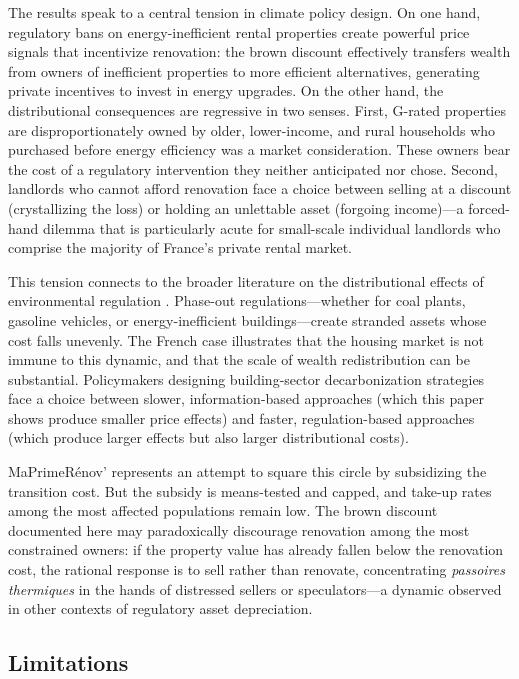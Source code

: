 \documentclass[12pt]{article}
\begin{document}
The results speak to a central tension in climate policy design. On one hand, regulatory bans on energy-inefficient rental properties create powerful price signals that incentivize renovation: the brown discount effectively transfers wealth from owners of inefficient properties to more efficient alternatives, generating private incentives to invest in energy upgrades. On the other hand, the distributional consequences are regressive in two senses. First, G-rated properties are disproportionately owned by older, lower-income, and rural households who purchased before energy efficiency was a market consideration. These owners bear the cost of a regulatory intervention they neither anticipated nor chose. Second, landlords who cannot afford renovation face a choice between selling at a discount (crystallizing the loss) or holding an unlettable asset (forgoing income)---a forced-hand dilemma that is particularly acute for small-scale individual landlords who comprise the majority of France's private rental market.

This tension connects to the broader literature on the distributional effects of environmental regulation \citep{davis2024cost}. Phase-out regulations---whether for coal plants, gasoline vehicles, or energy-inefficient buildings---create stranded assets whose cost falls unevenly. The French case illustrates that the housing market is not immune to this dynamic, and that the scale of wealth redistribution can be substantial. Policymakers designing building-sector decarbonization strategies face a choice between slower, information-based approaches (which this paper shows produce smaller price effects) and faster, regulation-based approaches (which produce larger effects but also larger distributional costs).

MaPrimeR\'enov' represents an attempt to square this circle by subsidizing the transition cost. But the subsidy is means-tested and capped, and take-up rates among the most affected populations remain low. The brown discount documented here may paradoxically discourage renovation among the most constrained owners: if the property value has already fallen below the renovation cost, the rational response is to sell rather than renovate, concentrating \textit{passoires thermiques} in the hands of distressed sellers or speculators---a dynamic observed in other contexts of regulatory asset depreciation.

\subsection{Limitations}
\end{document}
